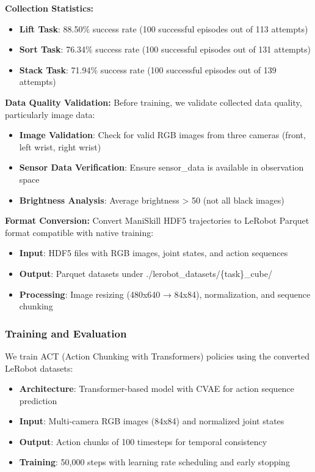 \documentclass[10pt]{article} %
\begin{document}
\textbf{Collection Statistics:}
\begin{itemize}
    \item \textbf{Lift Task}: 88.50\% success rate (100 successful episodes out of 113 attempts)
    \item \textbf{Sort Task}: 76.34\% success rate (100 successful episodes out of 131 attempts)
    \item \textbf{Stack Task}: 71.94\% success rate (100 successful episodes out of 139 attempts)
\end{itemize}

\textbf{Data Quality Validation:} Before training, we validate collected data quality, particularly image data:
\begin{itemize}
    \item \textbf{Image Validation}: Check for valid RGB images from three cameras (front, left wrist, right wrist)
    \item \textbf{Sensor Data Verification}: Ensure sensor\_data is available in observation space
    \item \textbf{Brightness Analysis}: Average brightness > 50 (not all black images)
\end{itemize}

\textbf{Format Conversion:} Convert ManiSkill HDF5 trajectories to LeRobot Parquet format compatible with native training:
\begin{itemize}
    \item \textbf{Input}: HDF5 files with RGB images, joint states, and action sequences
    \item \textbf{Output}: Parquet datasets under ./lerobot\_datasets/\{task\}\_cube/
    \item \textbf{Processing}: Image resizing (480x640 → 84x84), normalization, and sequence chunking
\end{itemize}

\subsubsection{Training and Evaluation}

We train ACT (Action Chunking with Transformers) policies using the converted LeRobot datasets:

\begin{itemize}
    \item \textbf{Architecture}: Transformer-based model with CVAE for action sequence prediction
    \item \textbf{Input}: Multi-camera RGB images (84x84) and normalized joint states
    \item \textbf{Output}: Action chunks of 100 timesteps for temporal consistency
    \item \textbf{Training}: 50,000 steps with learning rate scheduling and early stopping
\end{itemize}
\end{document}
